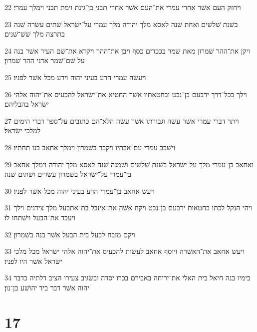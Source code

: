 \par 22 ויחזק העם אשׁר אחרי עמרי את־העם אשׁר אחרי תבני בן־גינת וימת תבני וימלך עמרי׃
\par 23 בשׁנת שׁלשׁים ואחת שׁנה לאסא מלך יהודה מלך עמרי על־ישׂראל שׁתים עשׂרה שׁנה בתרצה מלך שׁשׁ־שׁנים׃
\par 24 ויקן את־ההר שׁמרון מאת שׁמר בככרים כסף ויבן את־ההר ויקרא את־שׁם העיר אשׁר בנה על שׁם־שׁמר אדני ההר שׁמרון׃
\par 25 ויעשׂה עמרי הרע בעיני יהוה וירע מכל אשׁר לפניו׃
\par 26 וילך בכל־דרך ירבעם בן־נבט ובחטאתיו אשׁר החטיא את־ישׂראל להכעיס את־יהוה אלהי ישׂראל בהבליהם׃
\par 27 ויתר דברי עמרי אשׁר עשׂה וגבורתו אשׁר עשׂה הלא־הם כתובים על־ספר דברי הימים למלכי ישׂראל׃
\par 28 וישׁכב עמרי עם־אבתיו ויקבר בשׁמרון וימלך אחאב בנו תחתיו׃
\par 29 ואחאב בן־עמרי מלך על־ישׂראל בשׁנת שׁלשׁים ושׁמנה שׁנה לאסא מלך יהודה וימלך אחאב בן־עמרי על־ישׂראל בשׁמרון עשׂרים ושׁתים שׁנה׃
\par 30 ויעשׂ אחאב בן־עמרי הרע בעיני יהוה מכל אשׁר לפניו׃
\par 31 ויהי הנקל לכתו בחטאות ירבעם בן־נבט ויקח אשׁה את־איזבל בת־אתבעל מלך צידנים וילך ויעבד את־הבעל וישׁתחו לו׃
\par 32 ויקם מזבח לבעל בית הבעל אשׁר בנה בשׁמרון׃
\par 33 ויעשׂ אחאב את־האשׁרה ויוסף אחאב לעשׂות להכעיס את־יהוה אלהי ישׂראל מכל מלכי ישׂראל אשׁר היו לפניו׃
\par 34 בימיו בנה חיאל בית האלי את־יריחה באבירם בכרו יסדה ובשׂגיב צעירו הציב דלתיה כדבר יהוה אשׁר דבר ביד יהושׁע בן־נון׃

\chapter{17}

